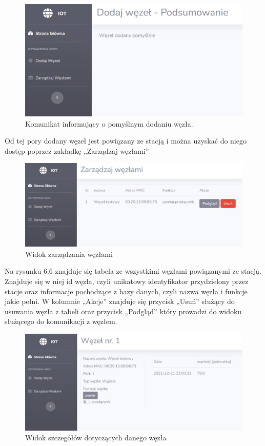 \documentclass[12pt, twoside, openany]{mwrep}
\begin{document}
\begin{figure}[H]
\centering
\includegraphics[scale=0.5]{test3}
\caption{Komunikat informujący o pomyślnym dodaniu węzła.}
\end{figure}
\par
Od tej pory dodany węzeł jest powiązany ze stacją i można uzyskać do niego dostęp poprzez zakładkę „Zarządzaj węzłami”
\begin{figure}[H]
\centering
\includegraphics[scale=0.5]{test4}
\caption{Widok zarządzania węzłami}
\end{figure}
\par
Na rysunku 6.6 znajduje się tabela ze wszystkimi węzłami powiązanymi ze stacją. Znajduje się w niej id węzła, czyli unikatowy identyfikator przydzielony przez stacje oraz informacje pochodzące z bazy danych, czyli nazwa węzła i funkcje jakie pełni. W kolumnie „Akcje” znajduje się przycisk „Usuń” służący do usuwania węzła z tabeli oraz przycisk „Podgląd” który prowadzi do widoku służącego do komunikacji z węzłem. 
\begin{figure}[H]
\centering
\includegraphics[scale=0.5]{test5}
\caption{Widok szczegółów dotyczących danego węzła}
\end{figure}
\end{document}
